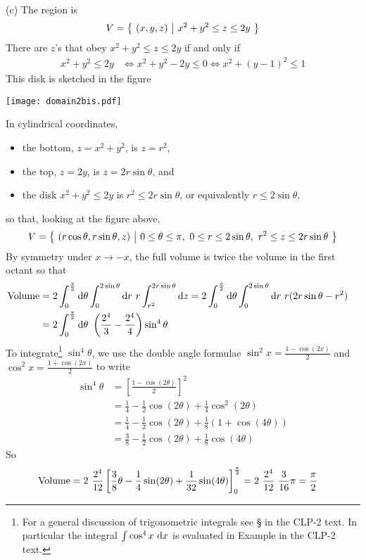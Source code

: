 \begin{solution}
(c) The region is 
\begin{equation*}
V = \big\{ \ (x,y,z)\ \big|\ x^2+y^2\le z\le 2y\ \big\}
\end{equation*}
There are $z$'s that obey $x^2+y^2\le z\le 2y$ if and only if
\begin{align*}
x^2+y^2\le 2y
&\iff x^2+y^2-2y \le 0
 \iff x^2 + (y-1)^2 \le 1
\end{align*}
This disk is sketched in the figure
\begin{center}
     \texttt{[image: domain2bis.pdf]}
\end{center}
In cylindrical coordinates, 
\begin{itemize}
\item
the bottom, $z=x^2+y^2$, is $z=r^2$, 
\item
the top, $z=2y$, is $z=2r\sin\theta$, and 
\item
the disk $x^2+y^2\le 2y$ is $r^2\le 2r\sin\theta$, or equivalently $r\le2\sin\theta$, 
\end{itemize}
so that, looking at the figure above,
\begin{equation*}
V = \big\{ \ (r\cos\theta,r\sin\theta,z)\ \big|\ 0\le\theta\le\pi,
                \ 0\le r\le 2\sin\theta,\ r^2\le z\le 2r\sin\theta\ \big\}
\end{equation*}
By symmetry under $x\rightarrow -x$, 
the full volume is twice the volume in the first octant so that
\begin{align*}
\text{Volume} 
&= 2\int_{0}^{{\pi\over 2}} \mathrm{d}\theta\int_0^{2\sin\theta}\mathrm{d}r\ r\int_{r^2}^{2r\sin\theta}\mathrm{d}z
= 2\int_{0}^{{\pi\over 2}} \mathrm{d}\theta\int_0^{2\sin\theta}\mathrm{d}r\ r(2r\sin\theta-r^2)\cr
&= 2\int_{0}^{{\pi\over 2}} \mathrm{d}\theta\ \left(\frac{2^4}{3}-\frac{2^4}{4}\right)\sin^4\theta
\end{align*}
To integrate\footnote{For a general discussion of trigonometric integrals see
\S{} in the CLP-2 text. In particular the integral  
$\int \cos^4 x\ \mathrm{d}x$ is evaluated in Example  
in the CLP-2 text.} 
$\sin^4\theta$, we use the double angle formulae
$\sin^2 x= \frac{1-\cos(2x)}{2}$ and $\cos^2 x= \frac{1+\cos(2x)}{2}$
to write
\begin{align*}
  \sin^4\theta &= \left[ \frac{1-\cos(2\theta)}{2} \right]^2 \\
   &= \frac{1}{4} - \frac{1}{2} \cos(2\theta) + \frac{1}{4}\cos^2(2\theta)\\
  &= \frac{1}{4} - \frac{1}{2} \cos(2\theta) + \frac{1}{8}\left(1 + \cos(4\theta) \right)\\
  &= \frac{3}{8} - \frac{1}{2} \cos(2\theta) + \frac{1}{8}\cos(4\theta)
\end{align*}
So
\begin{align*}
\text{Volume} 
&= 2\ \frac{2^4}{12} \left[
   \frac{3}{8}\theta - \frac{1}{4} \sin(2\theta) + \frac{1}{32}\sin(4\theta)
                                       \right]_0^{\pi\over 2}
= 2\ \frac{2^4}{12}\ \frac{3}{16}\pi
=\frac{\pi}{2}
\end{align*}
\end{solution}

